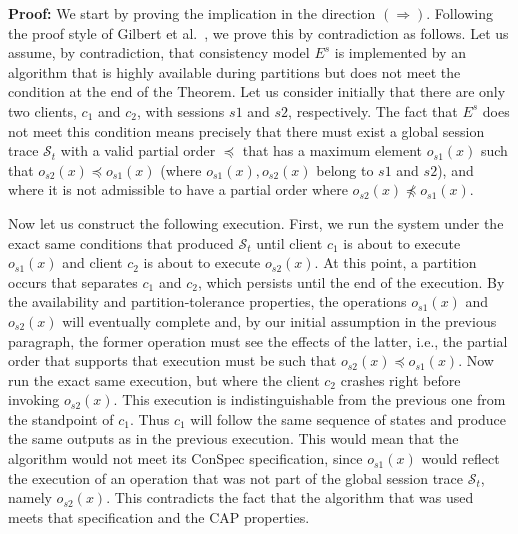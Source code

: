 \documentclass[journal,compsoc]{IEEEtran}
\begin{document}

\par \textbf{Proof:} We start by proving the implication in the direction $(\Rightarrow)$. Following the proof style of Gilbert et al.~\cite{Gilbert:2002:BCF:564585.564601}, we prove this by contradiction as follows.  Let us assume, by contradiction, that consistency model $E^s$ is implemented by an algorithm that is highly available during partitions but does not meet the condition at the end of the Theorem. Let us consider initially that there are only two clients, $c_1$ and $c_2$, with sessions $s1$ and $s2$, respectively. The fact that $E^s$  does not meet this condition means precisely that there must exist a global session trace $\mathcal{S}_t$ with a valid partial order $\preccurlyeq$ that has a maximum element $o_{s1}(x)$ such that $o_{s2}(x)\preccurlyeq o_{s1}(x)$ (where $o_{s1}(x),o_{s2}(x)$ belong to $s1$ and $s2$), and where it is not admissible to have a partial order where $o_{s2}(x)\not\preccurlyeq o_{s1}(x)$.

Now let us construct the following execution. First, we run the system under the exact same conditions that produced $\mathcal{S}_t$ until client $c_1$ is about to execute $o_{s1}(x)$ and client $c_2$ is about to execute $o_{s2}(x)$. At this point, a partition occurs that separates $c_1$ and $c_2$, which persists until the end of the execution. By the availability and partition-tolerance properties, the operations $o_{s1}(x)$ and $o_{s2}(x)$ will eventually complete and, by our initial assumption in the previous paragraph, the former operation must see the effects of the latter, i.e., the partial order that supports that execution must be such that $o_{s2}(x)\preccurlyeq o_{s1}(x)$. Now run the exact same execution, but where the client $c_2$ crashes right before invoking $o_{s2}(x)$. This execution is indistinguishable from the previous one from the standpoint of $c_1$. Thus $c_1$ will follow the same sequence of states and produce the same outputs as in the previous execution. This would mean that the algorithm would not meet its ConSpec specification, since $o_{s1}(x)$ would reflect the execution of an operation that was not part of the global session trace $\mathcal{S}_t$, namely $o_{s2}(x)$. This contradicts the fact that the algorithm that was used meets that specification and the CAP properties.
\end{document}
